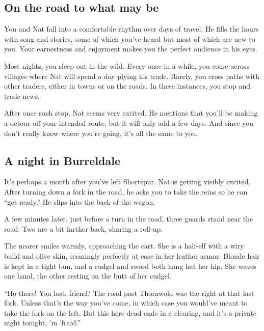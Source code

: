 \begin{multicols}{2}
  \subsection{On the road to what may be}
  \begin{aloud}
    You and Nat fall into a comfortable rhythm over days of travel.
    He fills the hours with song and stories, some of which you've heard but most of which are new to you.
    Your earnestness and enjoyment makes you the perfect audience in his eyes.

    Most nights, you sleep out in the wild.
    Every once in a while, you come across villages where Nat will spend a day plying his trade.
    Rarely, you cross paths with other traders, either in towns or on the roads.
	In these instances, you stop and trade news.
	
	After once such stop, Nat seems very excited.
	He mentions that you'll be making a detour off your intended route, but it will only add a few days.
	And since you don't really know where you're going, it's all the same to you.
  \end{aloud}

  \vfill\null
  \columnbreak

\subsection{A night in Burreldale}
  \begin{aloud}
    It's perhaps a month after you've left Shortspur.
    Nat is getting visibly excited.
    After turning down a fork in the road, he asks you to take the reins so he can ``get ready.''
    He slips into the back of the wagon.
    
    A few minutes later, just before a turn in the road, three guards stand near the road.
    Two are a bit farther back, sharing a roll-up.

    The nearer smiles warmly, approaching the cart.
    She is a half-elf with a wiry build and olive skin, seemingly perfectly at ease in her leather armor.
    Blonde hair is kept in a tight bun, and a cudgel and sword both hang hat her hip.
    She waves one hand, the other resting on the butt of her cudgel.
  \end{aloud}

  ``Ho there!
    You lost, friend?
    The road past Thornwold was the right at that last fork.
    Unless that's the way you've come, in which case you would've meant to take the fork on the left.
    But this here dead-ends in a clearing, and it's a private night tonight, 'm 'fraid.''


\end{multicols}
